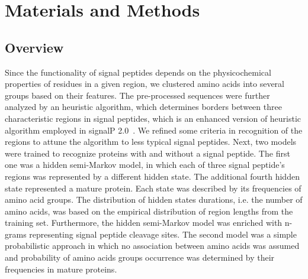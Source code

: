 \documentclass[10pt,letterpaper]{article}
\begin{document}



\section*{Materials and Methods}

\subsection*{Overview}

Since the functionality of signal peptides depends on the physicochemical properties of residues in a given region, we clustered amino acids into several groups based on their features. The pre-processed sequences were further analyzed by an heuristic algorithm, which determines borders between three characteristic regions in signal peptides, which is an enhanced version of heuristic algorithm employed in signalP 2.0~\cite{1998nielsenprediction}. We refined some criteria in recognition of the regions to attune the algorithm to less typical signal peptides. Next, two models were trained to recognize proteins with and without a signal peptide. The first one was a hidden semi-Markov model, in which each of three signal peptide's regions was represented by a different hidden state. The additional fourth hidden state represented a mature protein. Each state was described by its frequencies of amino acid groups. The distribution of hidden states durations, i.e. the number of amino acids, was based on the empirical distribution of region lengths from the training set. Furthermore, the hidden semi-Markov model was enriched with n-grams representing signal peptide cleavage sites. The second model was a simple probabilistic approach in which no association between amino acids was assumed and probability of amino acids groups occurrence was determined by their frequencies in mature proteins.
\end{document}
